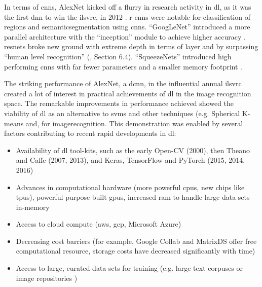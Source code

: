 In terms of \gls{cnn}s, AlexNet kicked off a flurry in research activity in \gls{dl}, as it was the first \gls{dnn} to win the \gls{ilsvrc}, in 2012 \cite{alexnet} \cite{dl_overview}. \gls{r-cnn}s were notable for classification of regions and \gls{semanticsegmentation} using \gls{cnn}s. \enquote{GoogLeNet} introduced a more parallel architecture with the \enquote{inception} module to achieve higher accuracy \cite{googlenet}. \gls{resnet}s broke new ground with extreme depth in terms of layer \cite{resnet} and by surpassing \enquote{human level recognition} (\cite{resnet_human}, Section 6.4). \enquote{SqueezeNets} introduced high performing \gls{cnn}s with far fewer parameters and a smaller memory footprint \cite{squeeze_net}. 
\bigskip


The striking performance of AlexNet, a \gls{dcnn}, in the influential annual \gls{ilsvrc} created a lot of interest in practical achievements of \gls{dl} in the image recognition space. The remarkable improvements in performance achieved showed the viability of \gls{dl} as an alternative to \gls{svm}s and other techniques (e.g. Spherical K-means and, for \gls{imagerecognition}. This demonstration was enabled by several factors contributing to recent rapid developments in \gls{dl}: 

\begin{itemize}
    \item Availability of \gls{dl} tool-kits, such as the early Open-CV (2000), then Theano and Caffe (2007, 2013), and Keras, TensorFlow and PyTorch (2015, 2014, 2016)
    \item Advances in computational hardware (more powerful \gls{cpu}s, new chips like \gls{tpu}s), powerful purpose-built \gls{gpu}s, increased \gls{ram} to handle large data sets in-memory
    \item Access to cloud compute (\gls{aws}, \gls{gcp}, Microsoft Azure) 
    \item Decreasing cost barriers (for example, Google Collab and MatrixDS offer free computational resource, storage costs have decreased significantly with time)
    \item Access to large, curated data sets for training (e.g. large text corpuses \cite{enron_emails} or image repositories \cite{image_net}) 
\end{itemize}

